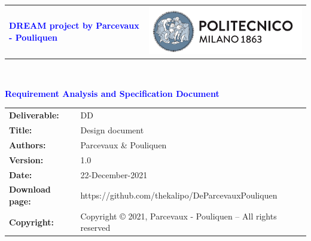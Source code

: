 




\begin{titlepage}



{\begin{table}[t!]
\centering
\begin{tabu} to \textwidth { X[1.3,r,p] X[1.7,l,p] }
\textcolor{Blue}
{\textbf{\small{DREAM project by Parcevaux - Pouliquen}}} & \includegraphics[scale=0.5]{Images/PolimiLogo}
\end{tabu}
\end{table}}~\\ [7cm]


\begin{flushleft}

{\textcolor{Blue}{\textbf{\Huge{Requirement Analysis and Specification
        Document}}}} \\ [1cm]

\end{flushleft}

\end{titlepage}

\begin{table}[h!]
\begin{tabu} to \textwidth { X[0.3,r,p] X[0.7,l,p] }
\hline

\textbf{Deliverable:} & DD\\
\textbf{Title:} & Design document \\
\textbf{Authors:} & Parcevaux \& Pouliquen \\
\textbf{Version:} & 1.0 \\ 
\textbf{Date:} & 22-December-2021 \\
\textbf{Download page:} & https://github.com/thekalipo/DeParcevauxPouliquen \\
\textbf{Copyright:} & Copyright © 2021, Parcevaux - Pouliquen – All rights reserved \\
\hline
\end{tabu}
\end{table}




